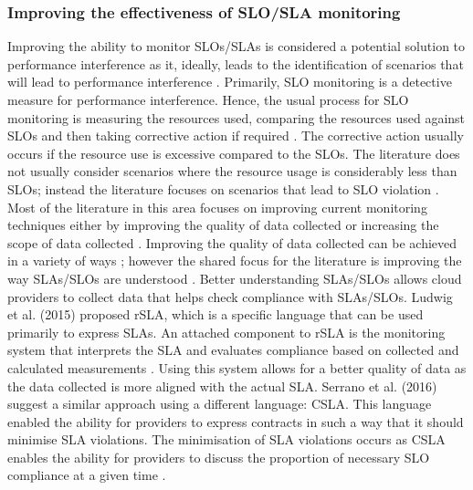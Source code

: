\subsubsection{Improving the effectiveness of SLO/SLA monitoring}
Improving the ability to monitor SLOs/SLAs is considered a potential
solution to performance interference as it, ideally, leads to the
identification of scenarios that will lead to performance interference \cite{zeginis2018slo}. Primarily, SLO monitoring is
a detective measure for performance interference. Hence, the usual
process for SLO monitoring is measuring the resources used, comparing
the resources used against SLOs and then taking corrective action if
required \cite{syed2017monitor}. The corrective
action usually occurs if the resource use is excessive compared to the
SLOs. The literature does not usually consider scenarios where the resource
usage is considerably less than SLOs; instead the literature focuses on scenarios that
lead to SLO violation \cite{labidi2017cloud, shen2011cloudscale,mosallanejad2013ha}. Most of the
literature in this area focuses on improving current monitoring
techniques either by improving the quality of data collected or
increasing the scope of data collected \cite{mosallanejad2013ha}.
\newline\newline
Improving the quality of data collected can be achieved in a variety of
ways \cite{labidi2017cloud}; however the
shared focus for the literature is improving the way SLAs/SLOs are
understood \cite{madni2016resource}. Better understanding
SLAs/SLOs allows cloud providers to collect data that helps check
compliance with SLAs/SLOs. Ludwig et al. (2015) proposed rSLA, which is
a specific language that can be used primarily to express SLAs. An
attached component to rSLA is the monitoring system that interprets the
SLA and evaluates compliance based on collected and calculated
measurements \cite{ludwig2015rsla}. Using this system allows for a better quality of data as
the data collected is more aligned with the actual SLA.
\newline\newline
Serrano et al. (2016) suggest a similar approach using a different
language: CSLA. This language enabled the ability for providers to
express contracts in such a way that it should minimise SLA violations.
The minimisation of SLA violations occurs as CSLA enables the ability
for providers to discuss the proportion of necessary SLO compliance at a
given time \cite{serrano2016sla}.
\newline\newline
